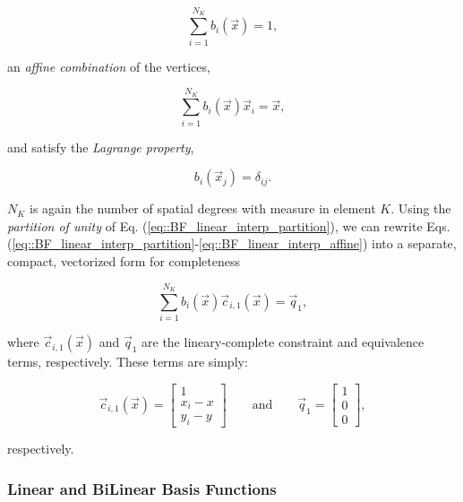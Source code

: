 \begin{equation}
\sum_{i=1}^{N_K} b_i (\vec{x})  =  1,
\label{eq::BF_linear_interp_partition}
\end{equation}

\noindent an {\em affine combination} of the vertices,

\begin{equation}
\sum_{i=1}^{N_K} b_i(\vec{x}) \vec{x}_i  =  \vec{x},
\label{eq::BF_linear_interp_affine}
\end{equation}

\noindent and satisfy the {\em Lagrange property},

\begin{equation}
b_i (\vec{x}_j) = \delta_{ij}.
\label{eq::BF_linear_interp_lagrange}
\end{equation}

\noindent $N_K$ is again the number of spatial degrees with measure in element $K$. Using the {\em partition of unity} of Eq. (\ref{eq::BF_linear_interp_partition}), we can rewrite Eqs. (\ref{eq::BF_linear_interp_partition}-\ref{eq::BF_linear_interp_affine}) into a separate, compact, vectorized form for completeness

\begin{equation}
\sum_{i=1}^{N_K}  b_i (\vec{x}) \vec{c}_{i,1}(\vec{x}) = \vec{q}_1 ,
\label{eq::BF_linear_interp_req_vector}
\end{equation}

\noindent where $\vec{c}_{i,1}(\vec{x})$ and $\vec{q}_1$ are the lineary-complete constraint and equivalence terms, respectively. These terms are simply:

\begin{equation}
\vec{c}_{i,1}(\vec{x}) = \left[
\begin{array}{c}
1 \\
x_i - x \\
y_i - y
\end{array} \right]
  \qquad \text{and} \qquad \vec{q}_1 = \left[
\begin{array}{c}
1 \\
0 \\
0
\end{array} \right],
\label{eq::BF_linear_constraint_terms}
\end{equation}

\noindent respectively.

\subsubsection{Linear and BiLinear Basis Functions}
\label{sec::BF_2D_Linear_LDandBLD}

